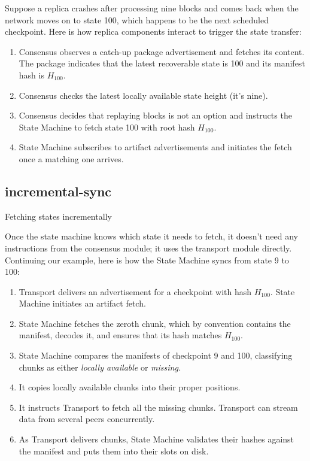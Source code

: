 \documentclass{article}
\begin{document}
Suppose a replica crashes after processing nine blocks
and comes back when the network moves on to state 100,
which happens to be the next scheduled checkpoint.
Here is how replica components interact to trigger the state transfer:

\begin{enumerate}
\item
  Consensus observes a catch-up package advertisement and fetches its content.
  The package indicates that the latest recoverable state is 100
  and its manifest hash is $H_{100}$.
\item
  Consensus checks the latest locally available state height (it's nine).
\item
  Consensus decides that replaying blocks is not an option
  and instructs the State Machine to fetch state 100 with root hash $H_{100}$.
\item
  State Machine subscribes to artifact advertisements
  and initiates the fetch once a matching one arrives.
\end{enumerate}

\subsection{incremental-sync}{Fetching states incrementally}

Once the state machine knows which state it needs to fetch,
it doesn't need any instructions from the consensus module;
it uses the transport module directly.
Continuing our example,
here is how the State Machine syncs from state 9 to 100:

\begin{enumerate}
\item
  Transport delivers an advertisement for a checkpoint with hash $H_{100}$.
  State Machine initiates an artifact fetch.
\item
  State Machine fetches the zeroth chunk, which by convention contains the manifest,
  decodes it,
  and ensures that its hash matches $H_100$.
\item
  State Machine compares the manifests of checkpoint 9 and 100,
  classifying chunks as either \emph{locally available} or \emph{missing.}
\item 
  It copies locally available chunks into their proper positions.
\item
  It instructs Transport to fetch all the missing chunks.
  Transport can stream data from several peers concurrently.
\item
  As Transport delivers chunks,
  State Machine validates their hashes against the manifest
  and puts them into their slots on disk.
\end{enumerate}
\end{document}
